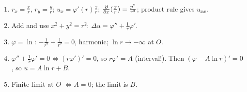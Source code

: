 \begin{remember}[unbreakable]
\begin{enumerate}
  \item $r_x=\frac xr$, $r_y=\frac yr$; $u_x=\varphi'(r)\frac xr$; $\frac{\partial }{\partial x}(\frac xr)=\frac{y^2}{r^3}$; product rule gives $u_{xx}$.
  \item Add and use $x^2+y^2=r^2$: $\Delta u=\varphi''+\frac1r\varphi'$.
  \item $\varphi=\ln$: $-\frac1{r^2}+\frac1{r^2}=0$, harmonic; $\ln r\to-\infty$ at $O$.
  \item $\varphi''+\frac1r\varphi'=0\iff(r\varphi')'=0$, so $r\varphi'=A$ (interval!). Then $(\varphi-A\ln r)'=0$, so $u=A\ln r+B$.
  \item Finite limit at $O$ $\iff A=0$; the limit is $B$.
\end{enumerate}
\end{remember}
